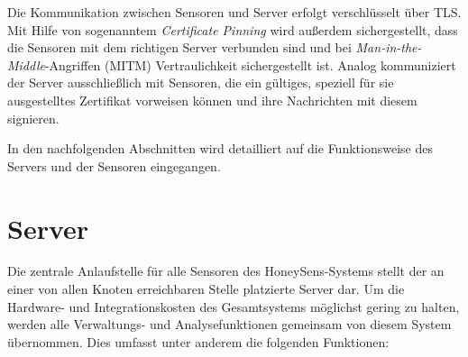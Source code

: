 \documentclass[12pt]{article}
\begin{document}
Die Kommunikation zwischen Sensoren und Server erfolgt verschlüsselt über TLS. Mit Hilfe von sogenanntem \textit{Certificate Pinning} wird außerdem sichergestellt, dass die Sensoren mit dem richtigen Server verbunden sind und bei \textit{Man-in-the-Middle}-Angriffen (MITM) Vertraulichkeit sichergestellt ist. Analog kommuniziert der Server ausschließlich mit Sensoren, die ein gültiges, speziell für sie ausgestelltes Zertifikat vorweisen können und ihre Nachrichten mit diesem signieren.

In den nachfolgenden Abschnitten wird detailliert auf die Funktionsweise des Servers und der Sensoren eingegangen.

\section{Server}
Die zentrale Anlaufstelle für alle Sensoren des HoneySens-Systems stellt der an einer von allen Knoten erreichbaren Stelle platzierte Server dar. Um die Hardware- und Integrationskosten des Gesamtsystems möglichst gering zu halten, werden alle Verwaltungs- und Analysefunktionen gemeinsam von diesem System übernommen. Dies umfasst unter anderem die folgenden Funktionen:
\end{document}
